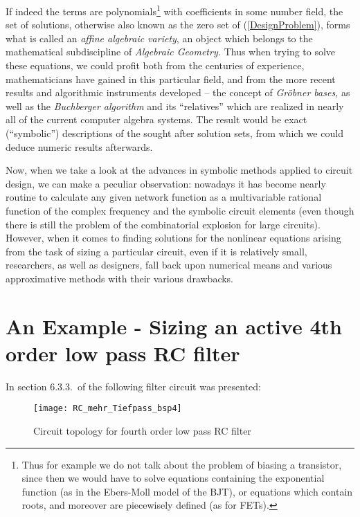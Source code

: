 \documentclass[10pt,twocolumn,pagenumbers]{IEEEtran}
\begin{document}
\noindent
If indeed the terms  are polynomials\footnote{Thus for example we do not talk about the problem of biasing a transistor, since then we would have to solve equations containing the exponential function (as in the Ebers-Moll model of the BJT), or equations which contain roots, and moreover are piecewisely defined (as for FETs).} with coefficients in some number field, 
the set of solutions, other\-wise also known as the zero set of (\ref{DesignProblem}), 
forms what is called an {\sl affine algebraic variety}, an object which belongs to the mathematical subdiscipline  
 of {\sl Algebraic Geometry.}
Thus when trying to solve these equations, we could profit both from the centuries of experience, mathematicians have gained in this particular field, and from
the more recent results and algorithmic instruments developed
-- the concept of {\sl Gr\"obner bases,} as well as the {\sl Buchberger algorithm} and its ``relatives'' which are realized  in nearly all of the current computer algebra systems. 
The result would be exact (``symbolic'') descriptions of the sought after solution sets, from which we could deduce numeric results afterwards. 

\noindent
Now, when we take a look at the advances in symbolic methods applied to circuit design, we can make a peculiar observation: nowadays it has become nearly routine to calculate any given network function as a multivariable rational function of the complex frequency  and the symbolic circuit elements (even though there is still the problem of the combinatorial explosion for large circuits). However, when it comes to finding solutions for the nonlinear equations arising from the task of sizing a particular circuit, even if it is relatively small, researchers, as well as designers, fall back upon numerical means and various approximative methods with their various drawbacks.


\section{An Example - Sizing an active 4th order low pass RC filter}

In section 6.3.3.\ of \cite{HieuDiss} the following filter circuit was presented:

\begin{figure}[!ht]
\begin{center}
\texttt{[image: RC\_mehr\_Tiefpass\_bsp4]}
\parbox{.8\linewidth}{
\caption{Circuit topology for fourth order low pass RC filter}
}
\end{center}
\end{figure}
\end{document}
